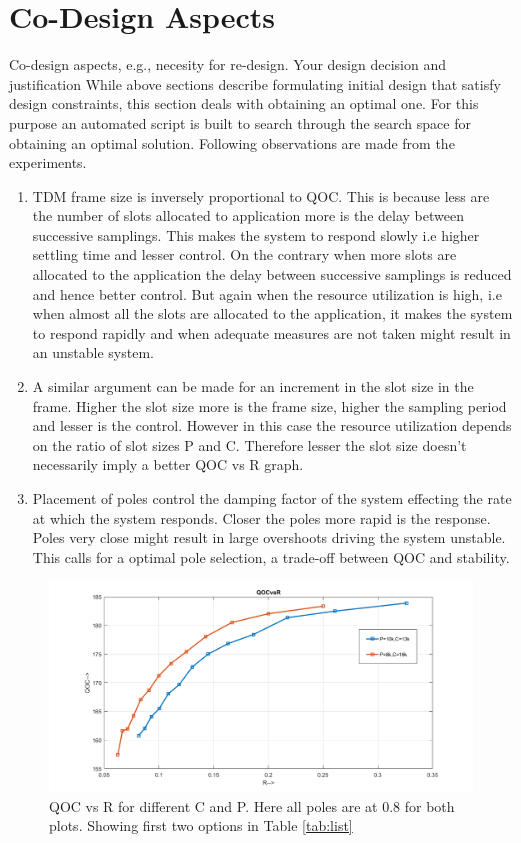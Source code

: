 \section{Co-Design Aspects}
\color{red}
Co-design	aspects,	e.g.,	necesity for	re-design.	Your	design	decision	and	justification
\color{black}
While above sections describe formulating initial design that satisfy design constraints, this section deals with obtaining an optimal one. For this purpose an automated script is built to search through the search space for obtaining an optimal solution. Following observations are made from the experiments.

\begin{enumerate}
	\item TDM frame size is inversely proportional to QOC. This is because less are the number of slots allocated to application more is the delay between successive samplings. This makes the system to respond slowly i.e higher settling time and lesser control. On the contrary when more slots are allocated to the application the delay between successive samplings is reduced and hence better control. But again when the resource utilization is high, i.e when almost all the slots are allocated to the application, it makes the system to respond rapidly and when adequate measures are not taken might result in an unstable system.
	
	\item A similar argument can be made for an increment in the slot size in the frame. Higher the slot size more is the frame size, higher the sampling period and lesser is the control. However in this case the resource utilization depends on the ratio of slot sizes P and C. Therefore lesser the slot size  doesn't necessarily imply a better QOC vs R graph.
	
	\item Placement of poles control the damping factor of the system effecting the rate at which the system responds. Closer the poles more rapid is the response. Poles very close might result in large overshoots driving the system unstable. This calls for a optimal pole selection, a trade-off between QOC and stability.
\end{enumerate}

\begin{figure}[h]
	\begin{center}
		\includegraphics[width=\linewidth]{img/qoc2}
		\caption{QOC vs R for different C and P. Here all poles are at 0.8 for both plots. Showing first two options in Table \ref{tab:list}}
		\label{fig:qoc2}
	\end{center}
\end{figure}